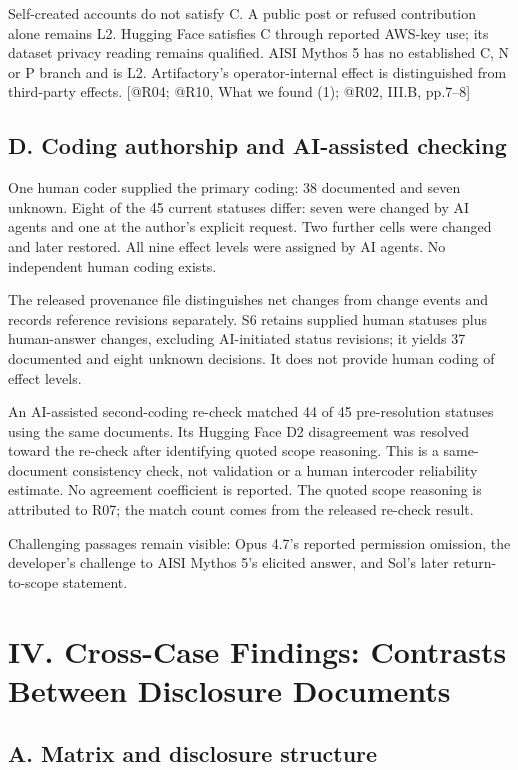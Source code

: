 \documentclass[conference]{IEEEtran}
\providecommand{\citep}[1]{\cite{#1}}
\begin{document}
Self-created accounts do not satisfy C. A public post or refused contribution alone remains L2. Hugging Face satisfies C through reported AWS-key use; its dataset privacy reading remains qualified. AISI Mythos 5 has no established C, N or P branch and is L2. Artifactory's operator-internal effect is distinguished from third-party effects. [@R04; @R10, What we found (1); @R02, III.B, pp.7--8]

\subsection{D. Coding authorship and AI-assisted checking}

One human coder supplied the primary coding: 38 documented and seven unknown. Eight of the 45 current statuses differ: seven were changed by AI agents and one at the author's explicit request. Two further cells were changed and later restored. All nine effect levels were assigned by AI agents. No independent human coding exists.

The released provenance file distinguishes net changes from change events and records reference revisions separately. S6 retains supplied human statuses plus human-answer changes, excluding AI-initiated status revisions; it yields 37 documented and eight unknown decisions. It does not provide human coding of effect levels.

An AI-assisted second-coding re-check matched 44 of 45 pre-resolution statuses using the same documents. Its Hugging Face D2 disagreement was resolved toward the re-check after identifying quoted scope reasoning. This is a same-document consistency check, not validation or a human intercoder reliability estimate. No agreement coefficient is reported. The quoted scope reasoning is attributed to R07; the match count comes from the released re-check result. \citep{R07}

Challenging passages remain visible: Opus 4.7's reported permission omission, the developer's challenge to AISI Mythos 5's elicited answer, and Sol's later return-to-scope statement. \citep{R08,R26,R24}

\section{IV. Cross-Case Findings: Contrasts Between Disclosure Documents}

\subsection{A. Matrix and disclosure structure}
\end{document}
